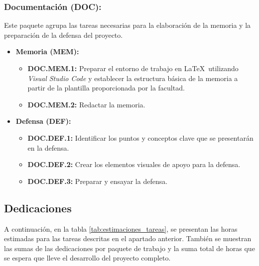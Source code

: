 \subsubsection{Documentación (DOC):}

Este paquete agrupa las tareas necesarias para la elaboración de la memoria y la preparación de la defensa del proyecto.

\begin{itemize}
    \item \textbf{Memoria (MEM):}
          \begin{itemize}
              \item \textbf{DOC.MEM.1:} Preparar el entorno de trabajo en \LaTeX\ utilizando \textit{Visual Studio Code} y establecer la estructura básica de la memoria a partir de la plantilla proporcionada por la facultad.
              \item \textbf{DOC.MEM.2:} Redactar la memoria.
          \end{itemize}
    \item \textbf{Defensa (DEF):}
          \begin{itemize}
              \item \textbf{DOC.DEF.1:} Identificar los puntos y conceptos clave que se presentarán en la defensa.
              \item \textbf{DOC.DEF.2:} Crear los elementos visuales de apoyo para la defensa.
              \item \textbf{DOC.DEF.3:} Preparar y ensayar la defensa.
          \end{itemize}
\end{itemize}

\cleardoublepage

\subsection{Dedicaciones}

A continuación, en la tabla \ref{tab:estimaciones_tareas}, se presentan las horas estimadas para las tareas descritas en el apartado anterior. También se muestran las sumas de las dedicaciones por paquete de trabajo y la suma total de horas que se espera que lleve el desarrollo del proyecto completo.

